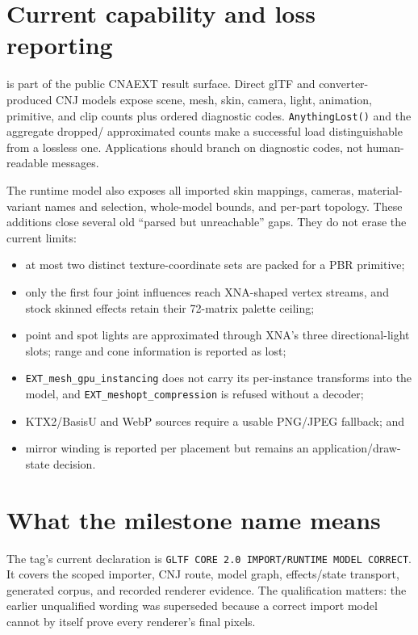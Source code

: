 \section{Current capability and loss reporting}

 is part of the public CNAEXT result surface. Direct glTF and
converter-produced CNJ models expose scene, mesh, skin, camera, light, animation, primitive, and
clip counts plus ordered diagnostic codes. \texttt{AnythingLost()} and the aggregate dropped/
approximated counts make a successful load distinguishable from a lossless one. Applications
should branch on diagnostic codes, not human-readable messages.

The runtime model also exposes all imported skin mappings, cameras, material-variant names and
selection, whole-model bounds, and per-part topology. These additions close several old ``parsed
but unreachable'' gaps. They do not erase the current limits:

\begin{itemize}
  \item at most two distinct texture-coordinate sets are packed for a PBR primitive;
  \item only the first four joint influences reach XNA-shaped vertex streams, and stock skinned
        effects retain their 72-matrix palette ceiling;
  \item point and spot lights are approximated through XNA's three directional-light slots;
        range and cone information is reported as lost;
  \item \texttt{EXT\_mesh\_gpu\_instancing} does not carry its per-instance transforms into the
        model, and \texttt{EXT\_meshopt\_compression} is refused without a decoder;
  \item KTX2/BasisU and WebP sources require a usable PNG/JPEG fallback; and
  \item mirror winding is reported per placement but remains an application/draw-state decision.
\end{itemize}

\section{What the milestone name means}

The tag's current declaration is
\texttt{GLTF CORE 2.0 IMPORT/RUNTIME MODEL CORRECT}. It covers the scoped importer, CNJ route,
model graph, effects/state transport, generated corpus, and recorded renderer evidence. The
qualification matters: the earlier unqualified wording was superseded because a correct import
model cannot by itself prove every renderer's final pixels.

